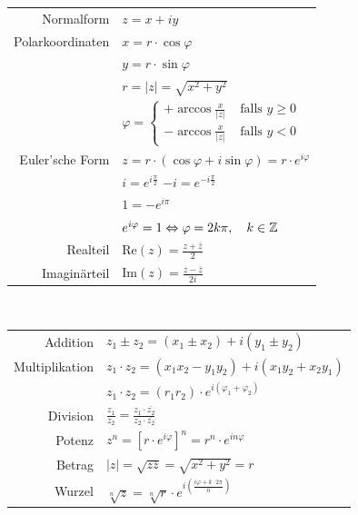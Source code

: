 \documentclass[a4paper]{article}
\begin{document}
	\begin{fregeln}[Rechenregeln]
		\vspace{-5mm}
		\begin{multicols}{2}
		\renewcommand{\arraystretch}{1.2}
				\begin{tabular}{r l}
					Normalform          &   $z = x + iy$ \\
					Polarkoordinaten    &   $x = r \cdot \cos\varphi$\\
										&	$y = r \cdot \sin\varphi$\\
										&	$r = |z| = \sqrt{x^2+y^2}$\\
										&	$\varphi =  \begin{cases}
		  										+ \arccos  \frac{x}{|z|}  & \text{ falls } y \geq 0\\
		  										- \arccos  \frac{x}{|z|}  & \text{ falls } y < 0
		  									\end{cases}$\\
					Euler'sche Form     &   $z = r \cdot (\cos\varphi + i \sin\varphi) = r \cdot e^{i\varphi}$\\
										&   $i = e^{i \frac{\pi}{2}}$ \hspace{4mm} $-i = e^{-i \frac{\pi}{2}}$\\
										&   $1 = -e^{i \pi}$\\
 										&	$e^{i \varphi} = 1 \Leftrightarrow \varphi = 2k\pi, \quad k \in \mathbb{Z}$\\
					Realteil            &   $\text{Re}(z) = \frac{z + \overline{z}}{2}$\\
					Imaginärteil        &   $\text{Im}(z) = \frac{z - \overline{z}}{2i}$
				\end{tabular}\\
				\begin{tabular}{r l}
					Addition            &   $z_1 \pm z_2 = (x_1 \pm x_2) + i(y_1 \pm y_2)$\\
					Multiplikation      &   $z_1 \cdot z_2 = (x_1x_2 - y_1y_2) + i(x_1y_2 + x_2y_1)$\\
												&   $z_1 \cdot z_2 = (r_1r_2) \cdot e^{i(\varphi_1 + \varphi_2)}$\\
					Division	&   $\frac{z_1}{z_2} = \frac{z_1 \cdot \overline{z_2}}{z_2 \cdot \overline{z_2}}$\\
					Potenz		&   $z^n = [r \cdot e^{i\varphi}]^n = r^n \cdot e^{in\varphi}$\\
					Betrag		&   $|z| = \sqrt{z \overline{z}} = \sqrt{x^2+y^2} = r$ \\
					Wurzel		& $\sqrt[n]{z} = \sqrt[n]{r}\cdot e^{i\left(\frac{i\varphi + k\cdot 2 \pi}{n}\right)}$\\

\end{tabular}
\end{multicols}
\end{fregeln}
\end{document}
